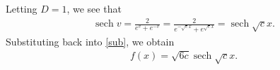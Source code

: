 \documentclass[12pt,reqno]{amsart}
\numberwithin{equation}{section}  %
\DeclareMathOperator{\sech}{sech}
\begin{document}
       Letting $D =1$, we see that
       \begin{equation*}
       \begin{split}
         \sech v =  \frac{2}{e^{v} + e^{-v}} = \frac{2}{e^{- \sqrt{c}x} +
         e^{\sqrt{c}x}} = \sech{\sqrt{c} x}.
       \end{split}
       \end{equation*}
       Substituting back into \eqref{sub}, we obtain
       \begin{equation*}
       \begin{split}
         f(x) = \sqrt{6 c} \sech{\sqrt{c} x}.
       \end{split}
       \end{equation*}

        





        
\end{document}
